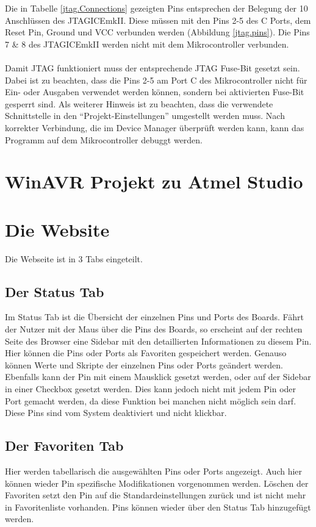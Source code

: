 Die in Tabelle \ref{jtag.Connections} gezeigten Pins entsprechen der Belegung
der 10 Anschlüssen des JTAGICEmkII. Diese müssen mit den Pins 2-5 des C Ports, dem
Reset Pin, Ground und VCC verbunden werden (Abbildung \ref{jtag.pins}). Die Pins 7 \& 8
des JTAGICEmkII werden nicht mit dem Mikrocontroller verbunden.\\
\\
Damit \ac{JTAG} funktioniert muss der entsprechende \ac{JTAG} Fuse-Bit gesetzt sein.
Dabei ist zu beachten, dass die Pins 2-5 am Port C des Mikrocontroller nicht für
Ein- oder Ausgaben verwendet werden können, sondern bei aktivierten Fuse-Bit
gesperrt sind. Als weiterer Hinweis ist zu beachten, dass die verwendete
Schnittstelle in den "`Projekt-Einstellungen"' umgestellt werden muss. Nach
korrekter Verbindung, die im Device Manager überprüft werden kann, kann das
Programm auf dem Mikrocontroller debuggt werden.

\section{WinAVR Projekt zu Atmel Studio}


\section{Die Website}

Die Webseite ist in 3 Tabs eingeteilt. 

\subsection{Der Status Tab}
Im Status Tab ist die Übersicht der
einzelnen Pins und Ports des Boards. Fährt der Nutzer mit der Maus über die Pins des
Boards, so erscheint auf der rechten Seite des Browser eine Sidebar mit den
detaillierten Informationen zu diesem Pin. Hier können die Pins oder Ports
als Favoriten gespeichert werden. Genauso können Werte und Skripte der einzelnen
Pins oder Ports geändert werden.\\
Ebenfalls kann der Pin mit einem Mausklick gesetzt werden, oder auf der Sidebar in einer 
Checkbox gesetzt werden. Dies kann jedoch nicht mit jedem Pin oder Port gemacht werden, da 
diese Funktion bei manchen nicht möglich sein darf. Diese Pins sind vom System deaktiviert und 
nicht klickbar.
\subsection{Der Favoriten Tab}
Hier werden tabellarisch die ausgewählten Pins oder Ports angezeigt. Auch hier
können wieder Pin spezifische Modifikationen vorgenommen werden. Löschen der
Favoriten setzt den Pin auf die Standardeinstellungen zurück und ist nicht mehr
in Favoritenliste vorhanden. Pins können wieder über den Status Tab hinzugefügt
werden.


